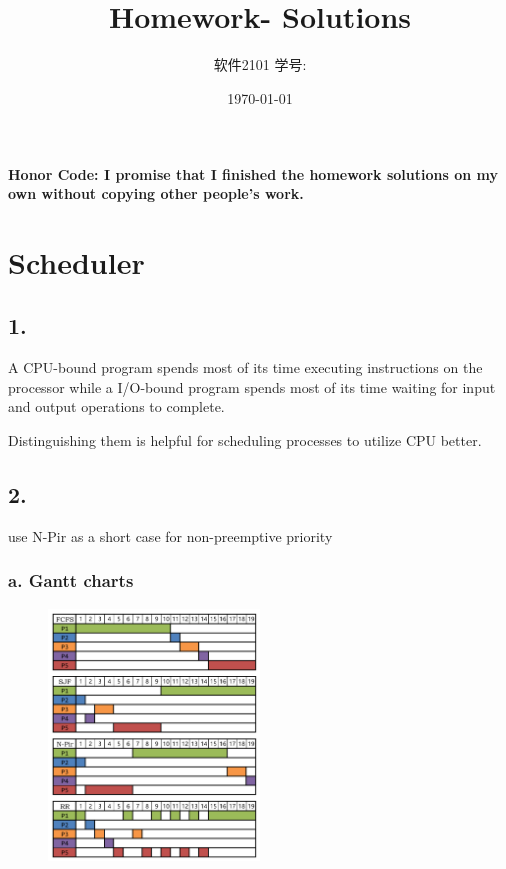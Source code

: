 \documentclass[11pt]{article}
\title{\vspace{-4cm}\CourseCodeName \space
        \Session \protect\\  Homework-\textbf{\Homework} Solutions}
\author{软件2101 \Name \space 学号: \SID}
\date{\today}
\begin{document}
\maketitle
\vspace{-0.8cm}
\textbf{Honor Code: I promise that I finished the homework solutions on my own without copying other people's 
    work.}

\section*{Scheduler}

\subsection*{1. }

A CPU-bound program spends most of its time executing instructions on the processor while a I/O-bound program spends 
most of its time waiting for input and output operations to complete. 

Distinguishing them is helpful for scheduling processes to utilize CPU better. 

\subsection*{2. }

use N-Pir as a short case for non-preemptive priority

\subsubsection*{a. Gantt charts}

\begin{figure}[H]
    \centering
    \includegraphics[width = 0.5\textwidth]{pic/gant.pdf}
\end{figure}
\end{document}
